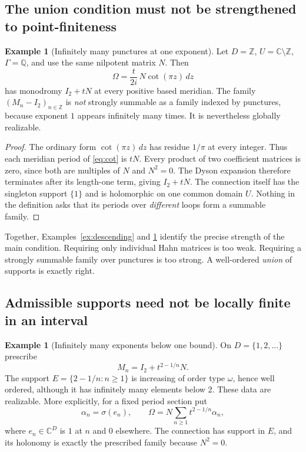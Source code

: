 \documentclass[11pt,letterpaper]{article}
\numberwithin{equation}{section}
\theoremstyle{definition}
\newtheorem{example}[theorem]{Example}
\theoremstyle{remark}
\newcommand{\C}{\mathbb C}
\newcommand{\Q}{\mathbb Q}
\newcommand{\Z}{\mathbb Z}
\begin{document}
\subsection{The union condition must not be strengthened to point-finiteness}
\begin{example}[Infinitely many punctures at one exponent]
\label{ex:same-exponent}
Let $D=\Z$, $U=\C\setminus\Z$, $\Gamma=\Q$, and use the same nilpotent
matrix $N$. Then
\begin{equation}\label{eq:cot}
 \Omega=\frac{t}{2i}\,N\cot(\pi z)\,dz
\end{equation}
has monodromy $I_2+tN$ at every positive based meridian.
The family $(M_n-I_2)_{n\in\Z}$ is \emph{not} strongly summable as a family
indexed by punctures, because exponent $1$ appears infinitely many times.
It is nevertheless globally realizable.
\end{example}
\begin{proof}
The ordinary form $\cot(\pi z)\,dz$ has residue $1/\pi$ at every integer.
Thus each meridian period of \eqref{eq:cot} is $tN$. Every product of two
coefficient matrices is zero, since both are multiples of $N$ and $N^2=0$.
The Dyson expansion therefore terminates after its length-one term, giving
$I_2+tN$. The connection itself has the singleton support $\{1\}$ and is
holomorphic on one common domain $U$. Nothing in the definition asks that
its periods over \emph{different} loops form a summable family.
\end{proof}

Together, Examples~\ref{ex:descending} and \ref{ex:same-exponent} identify
the precise strength of the main condition. Requiring only individual Hahn
matrices is too weak. Requiring a strongly summable family over punctures
is too strong. A well-ordered \emph{union} of supports is exactly right.

\subsection{Admissible supports need not be locally finite in an interval}
\begin{example}[Infinitely many exponents below one bound]
\label{ex:bounded-support}
On $D=\{1,2,\ldots\}$ prescribe
\[
 M_n=I_2+t^{2-1/n}N.
\]
The support $E=\{2-1/n:n\geq1\}$ is increasing of order type $\omega$, hence
well ordered, although it has infinitely many elements below $2$.
These data are realizable. More explicitly, for a fixed period section put
\[
 \alpha_n=\sigma(e_n),\qquad
 \Omega=N\sum_{n\geq1}t^{2-1/n}\alpha_n,
\]
where $e_n\in\C^D$ is $1$ at $n$ and $0$ elsewhere. The connection has support
in $E$, and its holonomy is exactly the prescribed family because $N^2=0$.
\end{example}
\end{document}
